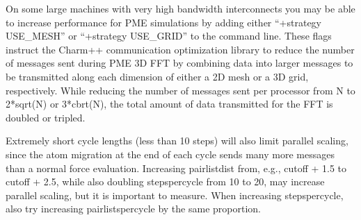 On some large machines with very high bandwidth interconnects you may
be able to increase performance for PME simulations by adding either
``+strategy USE\_MESH'' or ``+strategy USE\_GRID'' to the command line.
These flags instruct the Charm++ communication optimization library to
reduce the number of messages sent during PME 3D FFT by combining data
into larger messages to be transmitted along each dimension of either
a 2D mesh or a 3D grid, respectively.  While reducing the number of
messages sent per processor from N to 2*sqrt(N) or 3*cbrt(N), the
total amount of data transmitted for the FFT is doubled or tripled.

Extremely short cycle lengths (less than 10 steps) will also limit
parallel scaling, since the atom migration at the end of each cycle
sends many more messages than a normal force evaluation.  Increasing
pairlistdist from, e.g., cutoff + 1.5 to cutoff + 2.5, while also
doubling stepspercycle from 10 to 20, may increase parallel scaling,
but it is important to measure.  When increasing stepspercycle, also
try increasing pairlistspercycle by the same proportion.

